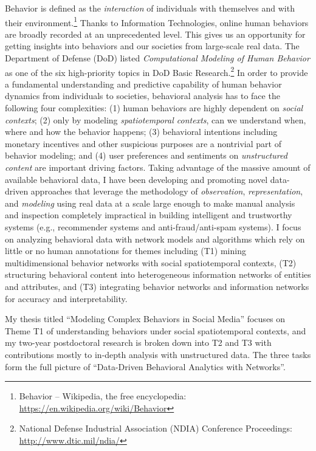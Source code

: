 \documentclass[10.5pt]{article}
\begin{document}
Behavior is defined as the \textit{interaction} of individuals with themselves and with their environment.\footnote{Behavior -- Wikipedia, the free encyclopedia: \url{https://en.wikipedia.org/wiki/Behavior}} Thanks to Information Technologies, online human behaviors are broadly recorded at an unprecedented level. This gives us an opportunity for getting insights into behaviors and our societies from large-scale real data. The Department of Defense (DoD) listed \textit{Computational Modeling of Human Behavior} as one of the six high-priority topics in DoD Basic Research.\footnote{National Defense Industrial Association (NDIA) Conference Proceedings: \url{http://www.dtic.mil/ndia/}} In order to provide a fundamental understanding and predictive capability of human behavior dynamics from individuals to societies, behavioral analysis has to face the following four complexities: (1) human behaviors are highly dependent on \textit{social contexts}; (2) only by modeling \textit{spatiotemporal contexts}, can we understand when, where and how the behavior happens; (3) behavioral intentions including monetary incentives and other suspicious purposes are a nontrivial part of behavior modeling; and (4) user preferences and sentiments on \textit{unstructured content} are important driving factors.
Taking advantage of the massive amount of available behavioral data, I have been developing and promoting novel data-driven approaches that leverage the methodology of \textit{observation}, \textit{representation}, and \textit{modeling} using real data at a scale large enough to make manual analysis and inspection completely impractical in building intelligent and trustworthy systems (e.g., recommender systems and anti-fraud/anti-spam systems). I focus on analyzing behavioral data with network models and algorithms which rely on little or no human annotations for themes including (T1) mining multidimensional behavior networks with social spatiotemporal contexts, (T2) structuring behavioral content into heterogeneous information networks of entities and attributes, and (T3) integrating behavior networks and information networks for accuracy and interpretability.

\vskip 0.05in
\vskip 0.01in

My thesis titled ``Modeling Complex Behaviors in Social Media'' focuses on Theme T1 of understanding behaviors under social spatiotemporal contexts, and my two-year postdoctoral research is broken down into T2 and T3 with contributions mostly to in-depth analysis with unstructured data. The three tasks form the full picture of ``Data-Driven Behavioral Analytics with Networks''.
\end{document}
